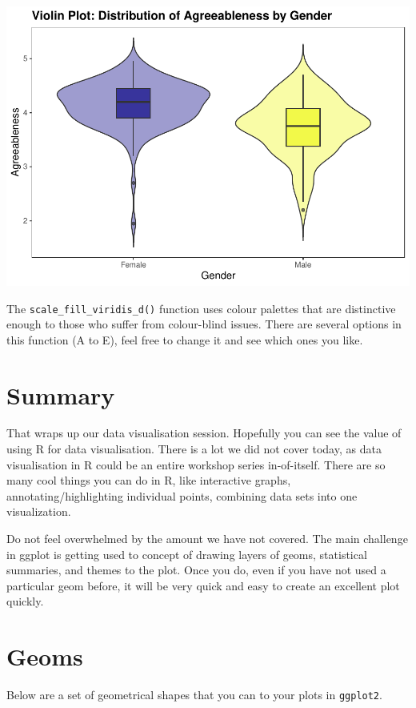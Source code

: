 \documentclass[
]{book}
\begin{document}
\includegraphics{rintro_demo_files/figure-latex/unnamed-chunk-328-1.pdf}

The \texttt{scale\_fill\_viridis\_d()} function uses colour palettes that are distinctive enough to those who suffer from colour-blind issues. There are several options in this function (A to E), feel free to change it and see which ones you like.

\hypertarget{summary-9}{%
\section{Summary}\label{summary-9}}

That wraps up our data visualisation session. Hopefully you can see the value of using R for data visualisation. There is a lot we did not cover today, as data visualisation in R could be an entire workshop series in-of-itself. There are so many cool things you can do in R, like interactive graphs, annotating/highlighting individual points, combining data sets into one visualization.

Do not feel overwhelmed by the amount we have not covered. The main challenge in ggplot is getting used to concept of drawing layers of geoms, statistical summaries, and themes to the plot. Once you do, even if you have not used a particular geom before, it will be very quick and easy to create an excellent plot quickly.

\hypertarget{geoms}{%
\section{Geoms}\label{geoms}}

Below are a set of geometrical shapes that you can to your plots in \texttt{ggplot2}.
\end{document}
